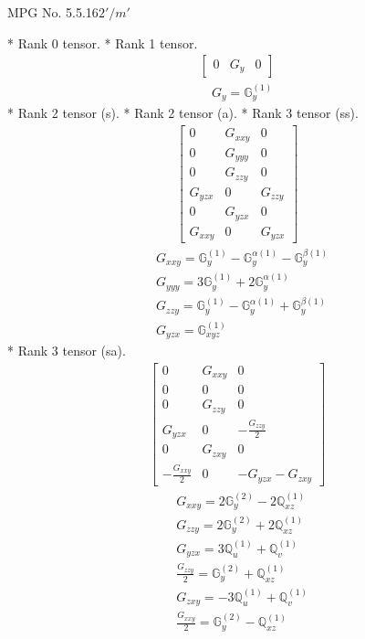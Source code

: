 \documentclass[fleqn,8pt,landscape]{jsarticle}
\begin{document}
\setcounter{MaxMatrixCols}{32}

\renewcommand{\tablename}{Table~}
\renewcommand{\figurename}{Figure~}
\begin{center}
\LARGE
MPG No. 5.5.16\quad$2'/m'$
\end{center}
* Rank 0 tensor.
* Rank 1 tensor.
\begin{align*}
\begin{bmatrix} 0 & G_{y} & 0 \end{bmatrix}
\end{align*}
\begin{align*}
& G_{y} = \mathbb{G}_{y}^{(1)}
\end{align*}
* Rank 2 tensor (s).
* Rank 2 tensor (a).
* Rank 3 tensor (ss).
\begin{align*}
\begin{bmatrix} 0 & G_{xxy} & 0 \\ 0 & G_{yyy} & 0 \\ 0 & G_{zzy} & 0 \\ G_{yzx} & 0 & G_{zzy} \\ 0 & G_{yzx} & 0 \\ G_{xxy} & 0 & G_{yzx} \end{bmatrix}
\end{align*}
\begin{align*}
& G_{xxy} = \mathbb{G}_{y}^{(1)} - \mathbb{G}_{y}^{\alpha(1)} - \mathbb{G}_{y}^{\beta(1)} \\
& G_{yyy} = 3 \mathbb{G}_{y}^{(1)} + 2 \mathbb{G}_{y}^{\alpha(1)} \\
& G_{zzy} = \mathbb{G}_{y}^{(1)} - \mathbb{G}_{y}^{\alpha(1)} + \mathbb{G}_{y}^{\beta(1)} \\
& G_{yzx} = \mathbb{G}_{xyz}^{(1)}
\end{align*}
* Rank 3 tensor (sa).
\begin{align*}
\begin{bmatrix} 0 & G_{xxy} & 0 \\ 0 & 0 & 0 \\ 0 & G_{zzy} & 0 \\ G_{yzx} & 0 & - \frac{G_{zzy}}{2} \\ 0 & G_{zxy} & 0 \\ - \frac{G_{xxy}}{2} & 0 & - G_{yzx} - G_{zxy} \end{bmatrix}
\end{align*}
\begin{align*}
& G_{xxy} = 2 \mathbb{G}_{y}^{(2)} - 2 \mathbb{Q}_{xz}^{(1)} \\
& G_{zzy} = 2 \mathbb{G}_{y}^{(2)} + 2 \mathbb{Q}_{xz}^{(1)} \\
& G_{yzx} = 3 \mathbb{Q}_{u}^{(1)} + \mathbb{Q}_{v}^{(1)} \\
& \frac{G_{zzy}}{2} = \mathbb{G}_{y}^{(2)} + \mathbb{Q}_{xz}^{(1)} \\
& G_{zxy} = - 3 \mathbb{Q}_{u}^{(1)} + \mathbb{Q}_{v}^{(1)} \\
& \frac{G_{xxy}}{2} = \mathbb{G}_{y}^{(2)} - \mathbb{Q}_{xz}^{(1)}
\end{align*}
\end{document}

